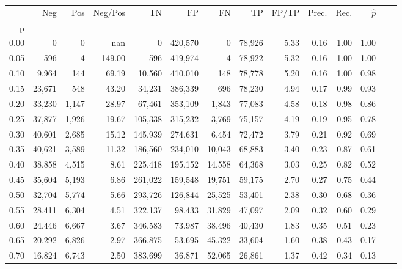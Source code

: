 \begin{tabular}{rrrrrrrrrrrrrr}
\toprule
{} &     Neg &    Pos & Neg/Pos &       TN &       FP &      FN &      TP & FP/TP & Prec. &  Rec. & $\hat{p}$ \\
p    &         &        &         &          &          &         &         &       &       &       &           \\
\midrule
0.00 &       0 &      0 &     nan &        0 &  420,570 &       0 &  78,926 &  5.33 &  0.16 &  1.00 &      1.00 \\
0.05 &     596 &      4 &  149.00 &      596 &  419,974 &       4 &  78,922 &  5.32 &  0.16 &  1.00 &      1.00 \\
0.10 &   9,964 &    144 &   69.19 &   10,560 &  410,010 &     148 &  78,778 &  5.20 &  0.16 &  1.00 &      0.98 \\
0.15 &  23,671 &    548 &   43.20 &   34,231 &  386,339 &     696 &  78,230 &  4.94 &  0.17 &  0.99 &      0.93 \\
0.20 &  33,230 &  1,147 &   28.97 &   67,461 &  353,109 &   1,843 &  77,083 &  4.58 &  0.18 &  0.98 &      0.86 \\
0.25 &  37,877 &  1,926 &   19.67 &  105,338 &  315,232 &   3,769 &  75,157 &  4.19 &  0.19 &  0.95 &      0.78 \\
0.30 &  40,601 &  2,685 &   15.12 &  145,939 &  274,631 &   6,454 &  72,472 &  3.79 &  0.21 &  0.92 &      0.69 \\
0.35 &  40,621 &  3,589 &   11.32 &  186,560 &  234,010 &  10,043 &  68,883 &  3.40 &  0.23 &  0.87 &      0.61 \\
0.40 &  38,858 &  4,515 &    8.61 &  225,418 &  195,152 &  14,558 &  64,368 &  3.03 &  0.25 &  0.82 &      0.52 \\
0.45 &  35,604 &  5,193 &    6.86 &  261,022 &  159,548 &  19,751 &  59,175 &  2.70 &  0.27 &  0.75 &      0.44 \\
0.50 &  32,704 &  5,774 &    5.66 &  293,726 &  126,844 &  25,525 &  53,401 &  2.38 &  0.30 &  0.68 &      0.36 \\
0.55 &  28,411 &  6,304 &    4.51 &  322,137 &   98,433 &  31,829 &  47,097 &  2.09 &  0.32 &  0.60 &      0.29 \\
0.60 &  24,446 &  6,667 &    3.67 &  346,583 &   73,987 &  38,496 &  40,430 &  1.83 &  0.35 &  0.51 &      0.23 \\
0.65 &  20,292 &  6,826 &    2.97 &  366,875 &   53,695 &  45,322 &  33,604 &  1.60 &  0.38 &  0.43 &      0.17 \\
0.70 &  16,824 &  6,743 &    2.50 &  383,699 &   36,871 &  52,065 &  26,861 &  1.37 &  0.42 &  0.34 &      0.13 \\

\end{tabular}
